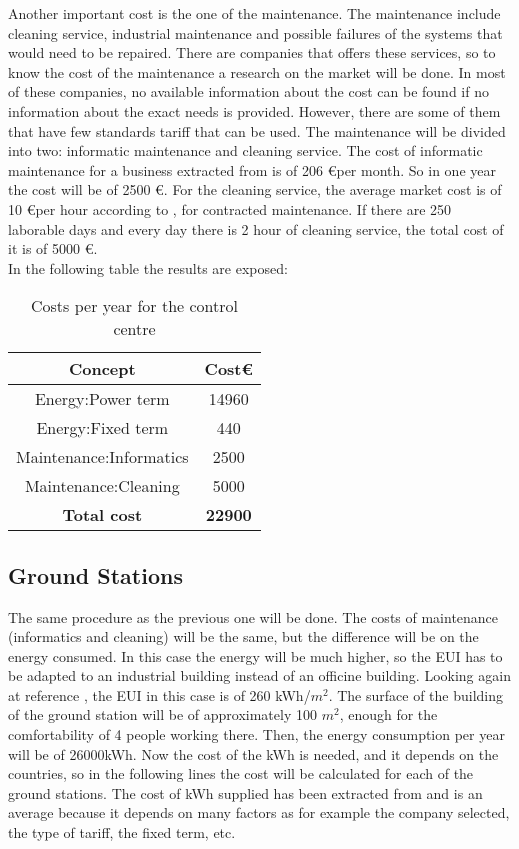 \documentclass[12pt,a4paper]{report}
\begin{document}
Another important cost is the one of the maintenance. The maintenance include cleaning service, industrial maintenance and possible failures of the systems that would need to be repaired. There are companies that offers these services, so to know the cost of the maintenance a research on the market will be done. In most of these companies, no available information about the cost can be found if no information about the exact needs is provided. However, there are some of them that have few standards tariff that can be used. The maintenance will be divided into two: informatic maintenance and cleaning service. The cost of informatic maintenance for a business extracted from \cite{inf} is of 206 \euro per month. So in one year the cost will be of 2500 \euro. For the cleaning service, the average market cost is of 10 \euro per hour according to \cite{clean}, for contracted maintenance. If there are 250 laborable days and every day there is 2 hour of cleaning service, the total cost of it is of 5000 \euro. \\
In the following table the results are exposed:
\begin{table}[H]
\begin{center}
\begin{tabular}{|c|c|}
\hline
\textbf{Concept}&\textbf{Cost\euro}\\
\hline
Energy:Power term&14960\\
\hline
Energy:Fixed term&440\\
\hline
Maintenance:Informatics&2500\\
\hline
Maintenance:Cleaning&5000\\
\hline
\textbf{Total cost}&\textbf{22900}\\
\hline
\end{tabular}
\caption{Costs per year for the control centre}
\end{center}
\end{table}
\subsection{Ground Stations}
The same procedure as the previous one will be done. The costs of maintenance (informatics and cleaning) will be the same, but the difference will be on the energy consumed. In this case the energy will be much higher, so the EUI has to be adapted to an industrial building instead of an officine building. Looking again at reference \cite{EUI}, the EUI in this case is of 260 kWh/$m^2$. The surface of the building of the ground station will be of approximately 100 $m^2$, enough for the comfortability of 4 people working there. Then, the energy consumption per year will be of 26000kWh. Now the cost of the kWh is needed, and it depends on the countries, so in the following lines the cost will be calculated for each of the ground stations. The cost of kWh supplied has been extracted from \cite{OVO} and is an average because it depends on many factors as for example the company selected, the type of tariff, the fixed term, etc. 
\end{document}
